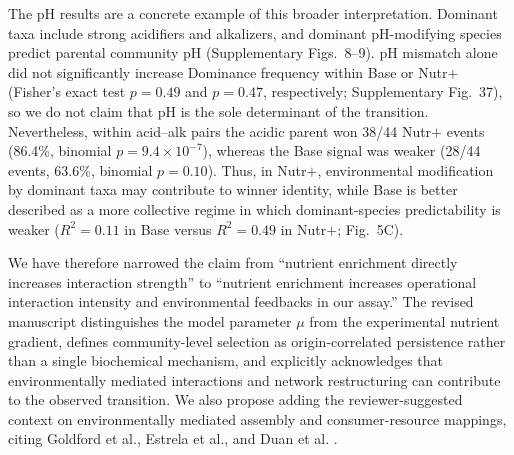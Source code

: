 The pH results are a concrete example of this broader interpretation. Dominant taxa include strong acidifiers and alkalizers, and dominant pH-modifying species predict parental community pH (Supplementary Figs.~8--9). pH mismatch alone did not significantly increase Dominance frequency within Base or Nutr$+$ (Fisher's exact test $p = 0.49$ and $p = 0.47$, respectively; Supplementary Fig.~37), so we do not claim that pH is the sole determinant of the transition. Nevertheless, within acid--alk pairs the acidic parent won 38/44 Nutr$+$ events (86.4\%, binomial $p = 9.4 \times 10^{-7}$), whereas the Base signal was weaker (28/44 events, 63.6\%, binomial $p = 0.10$). Thus, in Nutr$+$, environmental modification by dominant taxa may contribute to winner identity, while Base is better described as a more collective regime in which dominant-species predictability is weaker ($R^2 = 0.11$ in Base versus $R^2 = 0.49$ in Nutr$+$; Fig.~5C).

We have therefore narrowed the claim from ``nutrient enrichment directly increases interaction strength'' to ``nutrient enrichment increases operational interaction intensity and environmental feedbacks in our assay.'' The revised manuscript distinguishes the model parameter $\mu$ from the experimental nutrient gradient, defines community-level selection as origin-correlated persistence rather than a single biochemical mechanism, and explicitly acknowledges that environmentally mediated interactions and network restructuring can contribute to the observed transition. We also propose adding the reviewer-suggested context on environmentally mediated assembly and consumer-resource mappings, citing Goldford et al., Estrela et al., and Duan et al. \citep{Goldford2018,Estrela2021,DuanPawar2025}.

